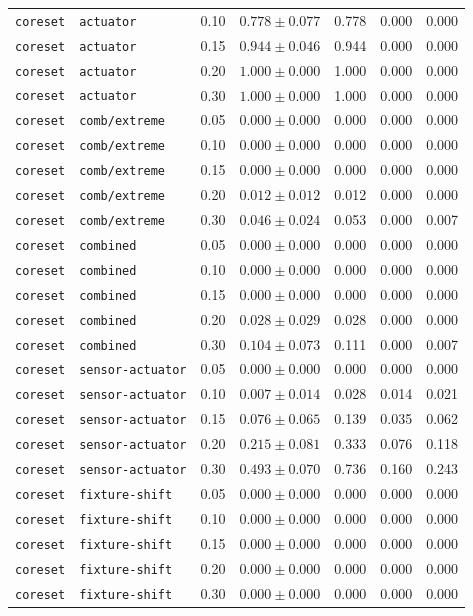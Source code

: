 \documentclass{article}
\begin{document}
\begin{center}
\begin{tabular}{lllcccc}
\texttt{coreset} & \texttt{actuator} & 0.10 & $0.778 \pm 0.077$ & 0.778 & 0.000 & 0.000 \\
\texttt{coreset} & \texttt{actuator} & 0.15 & $0.944 \pm 0.046$ & 0.944 & 0.000 & 0.000 \\
\texttt{coreset} & \texttt{actuator} & 0.20 & $1.000 \pm 0.000$ & 1.000 & 0.000 & 0.000 \\
\texttt{coreset} & \texttt{actuator} & 0.30 & $1.000 \pm 0.000$ & 1.000 & 0.000 & 0.000 \\
\texttt{coreset} & \texttt{comb/extreme} & 0.05 & $0.000 \pm 0.000$ & 0.000 & 0.000 & 0.000 \\
\texttt{coreset} & \texttt{comb/extreme} & 0.10 & $0.000 \pm 0.000$ & 0.000 & 0.000 & 0.000 \\
\texttt{coreset} & \texttt{comb/extreme} & 0.15 & $0.000 \pm 0.000$ & 0.000 & 0.000 & 0.000 \\
\texttt{coreset} & \texttt{comb/extreme} & 0.20 & $0.012 \pm 0.012$ & 0.012 & 0.000 & 0.000 \\
\texttt{coreset} & \texttt{comb/extreme} & 0.30 & $0.046 \pm 0.024$ & 0.053 & 0.000 & 0.007 \\
\texttt{coreset} & \texttt{combined} & 0.05 & $0.000 \pm 0.000$ & 0.000 & 0.000 & 0.000 \\
\texttt{coreset} & \texttt{combined} & 0.10 & $0.000 \pm 0.000$ & 0.000 & 0.000 & 0.000 \\
\texttt{coreset} & \texttt{combined} & 0.15 & $0.000 \pm 0.000$ & 0.000 & 0.000 & 0.000 \\
\texttt{coreset} & \texttt{combined} & 0.20 & $0.028 \pm 0.029$ & 0.028 & 0.000 & 0.000 \\
\texttt{coreset} & \texttt{combined} & 0.30 & $0.104 \pm 0.073$ & 0.111 & 0.000 & 0.007 \\
\texttt{coreset} & \texttt{sensor-actuator} & 0.05 & $0.000 \pm 0.000$ & 0.000 & 0.000 & 0.000 \\
\texttt{coreset} & \texttt{sensor-actuator} & 0.10 & $0.007 \pm 0.014$ & 0.028 & 0.014 & 0.021 \\
\texttt{coreset} & \texttt{sensor-actuator} & 0.15 & $0.076 \pm 0.065$ & 0.139 & 0.035 & 0.062 \\
\texttt{coreset} & \texttt{sensor-actuator} & 0.20 & $0.215 \pm 0.081$ & 0.333 & 0.076 & 0.118 \\
\texttt{coreset} & \texttt{sensor-actuator} & 0.30 & $0.493 \pm 0.070$ & 0.736 & 0.160 & 0.243 \\
\texttt{coreset} & \texttt{fixture-shift} & 0.05 & $0.000 \pm 0.000$ & 0.000 & 0.000 & 0.000 \\
\texttt{coreset} & \texttt{fixture-shift} & 0.10 & $0.000 \pm 0.000$ & 0.000 & 0.000 & 0.000 \\
\texttt{coreset} & \texttt{fixture-shift} & 0.15 & $0.000 \pm 0.000$ & 0.000 & 0.000 & 0.000 \\
\texttt{coreset} & \texttt{fixture-shift} & 0.20 & $0.000 \pm 0.000$ & 0.000 & 0.000 & 0.000 \\
\texttt{coreset} & \texttt{fixture-shift} & 0.30 & $0.000 \pm 0.000$ & 0.000 & 0.000 & 0.000 \\
\bottomrule
\end{tabular}
\end{center}
\end{document}
